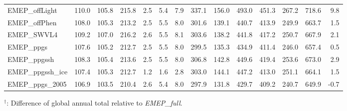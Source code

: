 \documentclass{scrartcl}
\begin{document}
\begin{itemize}
\begin{itemize}
\begin{table*}[t]
\begin{tabular}{lccccccccc|cccr}
    EMEP\_offLight & 110.0 & 105.8 & 215.8 & 2.5 & 5.4 & 7.9 & 337.1 & 156.0 & 493.0 & 451.3 & 267.2 & 718.6 & 9.8\\
    EMEP\_offPhen & 108.0 & 105.3 & 213.2 & 2.5 & 5.5 & 8.0 & 301.6 & 139.1 & 440.7 & 413.9 & 249.9 & 663.7 & 1.5\\
    EMEP\_SWVL4 & 109.2 & 107.0 & 216.2 & 2.6 & 5.5 & 8.1 & 303.6 & 138.2 & 441.8 & 417.2 & 250.7 & 667.9 & 2.1\\
    EMEP\_ppgs & 107.6 & 105.2 & 212.7 & 2.5 & 5.5 & 8.0 & 299.5 & 135.3 & 434.9 & 411.4 & 246.0 & 657.4 & 0.5\\
    EMEP\_ppgssh & 108.3 & 105.4 & 213.6 & 2.5 & 5.5 & 8.0 & 306.8 & 142.8 & 449.6 & 419.4 & 253.6 & 673.0 & 2.9\\
    EMEP\_ppgssh\_ice & 107.4 & 105.3 & 212.7 & 1.2 & 1.6 & 2.8 & 303.0 & 144.1 & 447.2 & 413.0 & 251.1 & 664.1 & 1.5\\
    EMEP\_ppgs\_2005 & 106.9 & 103.5 & 210.4 & 2.6 & 5.4 & 8.0 & 297.9 & 131.8 & 429.7 & 409.2 & 240.7 & 649.9 & -0.7\\
    \hline
  \end{tabular}
  {$^\dagger$: Difference of global annual total relative to \emph{EMEP\_full}.}%
  \label{tab:ozone_sinks}
\end{table*}
   

\end{itemize}
\end{itemize}
\end{document}
